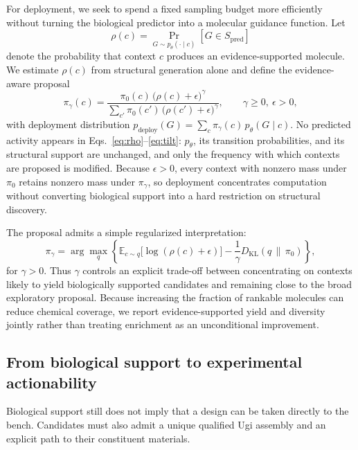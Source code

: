 \documentclass{article}
\newcommand{\Spred}{\ensuremath{S_{\mathrm{pred}}}}
\begin{document}
For deployment, we seek to spend a fixed sampling budget more efficiently without turning the
biological predictor into a molecular guidance function. Let
%
\begin{equation}
\label{eq:rho}
\rho(c) = \Pr_{G \sim p_\theta(\cdot \mid c)}\!\left[ G \in \Spred \right]
\end{equation}
%
denote the probability that context $c$ produces an evidence-supported molecule. We estimate $\rho(c)$
from structural generation alone and define the evidence-aware proposal
%
\begin{equation}
\label{eq:tilt}
\pi_\gamma(c)
= \frac{\pi_0(c)\, \bigl(\rho(c) + \epsilon\bigr)^{\gamma}}
       {\sum_{c'} \pi_0(c')\, \bigl(\rho(c') + \epsilon\bigr)^{\gamma}},
\qquad \gamma \ge 0,\ \epsilon > 0,
\end{equation}
%
with deployment distribution
$p_{\mathrm{deploy}}(G) = \sum_c \pi_\gamma(c)\, p_\theta(G \mid c)$. No predicted activity appears in
Eqs.~\eqref{eq:rho}--\eqref{eq:tilt}: $p_\theta$, its transition probabilities, and its structural
support are unchanged, and only the frequency with which contexts are proposed is modified. Because
$\epsilon > 0$, every context with nonzero mass under $\pi_0$ retains nonzero mass under $\pi_\gamma$,
so deployment concentrates computation without converting biological support into a hard restriction
on structural discovery.

The proposal admits a simple regularized interpretation:
%
\begin{equation}
\label{eq:kl}
\pi_\gamma
= \arg\max_{q} \left\{
\mathbb{E}_{c \sim q}\bigl[ \log(\rho(c) + \epsilon) \bigr]
- \frac{1}{\gamma} D_{\mathrm{KL}}\!\left( q \,\|\, \pi_0 \right)
\right\},
\end{equation}
%
for $\gamma > 0$. Thus $\gamma$ controls an explicit trade-off between concentrating on contexts likely
to yield biologically supported candidates and remaining close to the broad exploratory proposal.
Because increasing the fraction of rankable molecules can reduce chemical coverage, we report
evidence-supported yield and diversity jointly rather than treating enrichment as an unconditional
improvement.

\subsection{From biological support to experimental actionability}
\label{sec:actionability}
Biological support still does not imply that a design can be taken directly to the bench. Candidates
must also admit a unique qualified Ugi assembly and an explicit path to their constituent materials.
\end{document}
